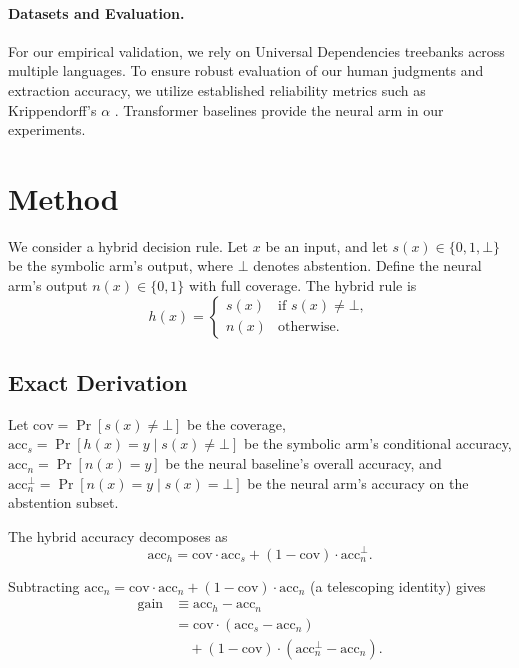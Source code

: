\documentclass[11pt,a4paper]{article}
\begin{document}
\paragraph{Datasets and Evaluation.}
For our empirical validation, we rely on Universal Dependencies treebanks \cite{nivre2020ud} across multiple languages. To ensure robust evaluation of our human judgments and extraction accuracy, we utilize established reliability metrics such as Krippendorff's $\alpha$ \cite{krippendorff2011computing}. Transformer baselines \cite{vaswani2017attention} provide the neural arm in our experiments.

\section{Method}
\label{sec:method}
We consider a hybrid decision rule. Let $x$ be an input, and let
$s(x) \in \{0,1,\bot\}$ be the symbolic arm's output, where $\bot$
denotes abstention. Define the neural arm's output $n(x) \in \{0,1\}$
with full coverage. The hybrid rule is
\begin{equation}
h(x) =
\begin{cases}
s(x) & \text{if } s(x) \neq \bot, \\
n(x) & \text{otherwise.}
\end{cases}
\end{equation}

\subsection{Exact Derivation}

Let $\text{cov} = \Pr[s(x) \neq \bot]$ be the coverage,
$\text{acc}_s = \Pr[h(x) = y \mid s(x) \neq \bot]$ be the symbolic
arm's conditional accuracy, $\text{acc}_n = \Pr[n(x) = y]$ be the
neural baseline's overall accuracy, and
$\text{acc}_n^{\bot} = \Pr[n(x) = y \mid s(x) = \bot]$ be the neural
arm's accuracy on the abstention subset.

The hybrid accuracy decomposes as
\begin{equation}
\text{acc}_h = \text{cov} \cdot \text{acc}_s
+ (1 - \text{cov}) \cdot \text{acc}_n^{\bot}.
\end{equation}

Subtracting $\text{acc}_n = \text{cov} \cdot \text{acc}_n
+ (1 - \text{cov}) \cdot \text{acc}_n$ (a telescoping identity) gives
\begin{align}
\text{gain} &\equiv \text{acc}_h - \text{acc}_n \nonumber \\
&= \text{cov} \cdot (\text{acc}_s - \text{acc}_n) \nonumber \\
&\quad + (1 - \text{cov}) \cdot
(\text{acc}_n^{\bot} - \text{acc}_n).
\label{eq:decomp}
\end{align}
\end{document}
